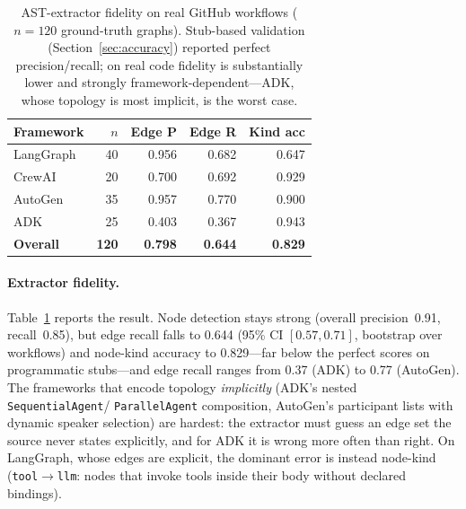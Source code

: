 \begin{table}[t]
\centering
\small
\caption{AST-extractor fidelity on real GitHub workflows ($n=120$ ground-truth
graphs). Stub-based validation (Section~\ref{sec:accuracy}) reported perfect
precision/recall; on real code fidelity is substantially lower and strongly
framework-dependent---ADK, whose topology is most implicit, is the worst case.}
\label{tab:realworld_fidelity}
\begin{tabular}{@{}lrrrr@{}}
\toprule
\textbf{Framework} & \textbf{$n$} & \textbf{Edge P} & \textbf{Edge R} & \textbf{Kind acc} \\
\midrule
LangGraph & 40  & 0.956 & 0.682 & 0.647 \\
CrewAI    & 20  & 0.700 & 0.692 & 0.929 \\
AutoGen   & 35  & 0.957 & 0.770 & 0.900 \\
ADK       & 25  & 0.403 & 0.367 & 0.943 \\
\midrule
\textbf{Overall} & \textbf{120} & \textbf{0.798} & \textbf{0.644} & \textbf{0.829} \\
\bottomrule
\end{tabular}
\end{table}

\paragraph{Extractor fidelity.}
Table~\ref{tab:realworld_fidelity} reports the result. Node detection stays
strong (overall precision~0.91, recall~0.85), but edge recall falls to 0.644
(95\% CI $[0.57,0.71]$, bootstrap over workflows) and
node-kind accuracy to 0.829---far below the perfect scores on programmatic
stubs---and edge recall ranges from 0.37 (ADK) to 0.77 (AutoGen). The frameworks
that encode topology \emph{implicitly} (ADK's nested \texttt{SequentialAgent}/
\texttt{ParallelAgent} composition, AutoGen's participant lists with dynamic
speaker selection) are hardest: the extractor must guess an edge set the source
never states explicitly, and for ADK it is wrong more often than right. On
LangGraph, whose edges are explicit, the dominant error is instead node-kind
(\texttt{tool}$\rightarrow$\texttt{llm}: nodes that invoke tools inside their
body without declared bindings).

